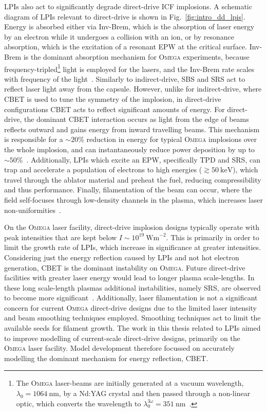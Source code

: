 \ac{LPIs} also act to significantly degrade direct-drive \ac{ICF} implosions.
A schematic diagram of \ac{LPIs} relevant to direct-drive is shown in Fig.~\ref{fig:intro_dd_lpis}.
Energy is absorbed either via \ac{Inv-Brem}, which is the absorption of laser energy by an electron while it undergoes a collision with an ion, or by resonance absorption, which is the excitation of a resonant \ac{EPW} at the critical surface.
\ac{Inv-Brem} is the dominant absorption mechanism for \textsc{Omega} experiments, because frequency-tripled\footnote{The \textsc{Omega} laser-beams are initially generated at a vacuum wavelength, $\lambda_0 = 1064\ \text{nm}$, by a Nd:YAG crystal and then passed through a non-linear optic, which converts the wavelength to $\lambda_0^{3\omega}=351\ \text{nm}$~\cite{boehly_upgrade_1995}.} light is employed for the lasers, and the \ac{Inv-Brem} rate scales with frequency of the light~\cite{huba_nrl_2013}.
Similarly to indirect-drive, \ac{SBS} and \ac{SRS} act to reflect laser light away from the capsule.
However, unlike for indirect-drive, where \ac{CBET} is used to tune the symmetry of the implosion, in direct-drive configurations \ac{CBET} acts to reflect significant amounts of energy.
For direct-drive, the dominant \ac{CBET} interaction occurs as light from the edge of beams reflects outward and gains energy from inward travelling beams.
This mechanism is responsible for a $\sim20\%$ reduction in energy for typical \textsc{Omega} implosions over the whole implosion, and can instantaneously reduce power deposition by up to $\sim50\%$~\cite{colaitis_inverse_2021}.
Additionally, \ac{LPIs} which excite an \ac{EPW}, specifically \ac{TPD} and \ac{SRS}, can trap and accelerate a population of electrons to high energies ($\gtrsim50\ \text{keV}$), which travel through the ablator material and preheat the fuel, reducing compressibility and thus performance.
Finally, filamentation of the beam can occur, where the field self-focuses through low-density channels in the plasma, which increases laser non-uniformities~\cite{afshar-rad_evidence_1992}.

On the \textsc{Omega} laser facility, direct-drive implosion designs typically operate with peak intensities that are kept below $I\sim10^{19}\ \text{Wm}^{-2}$.
This is primarily in order to limit the growth rate of \ac{LPIs}, which increase in significance at greater intensities.
Considering just the energy reflection caused by \ac{LPIs} and not hot electron generation, \ac{CBET} is the dominant instability on \textsc{Omega}.
Future direct-drive facilities with greater laser energy would lead to longer plasma scale-lengths.
In these long scale-length plasmas additional instabilities, namely \ac{SRS}, are observed to become more significant~\cite{scott_shock_2021}.
Additionally, laser filamentation is not a significant concern for current \textsc{Omega} direct-drive designs due to the limited laser intensity and beam smoothing techniques employed.
Smoothing techniques act to limit the available seeds for filament growth.
The work in this thesis related to \ac{LPIs} aimed to improve modelling of current-scale direct-drive designs, primarily on the \textsc{Omega} laser facility.
Model development therefore focussed on accurately modelling the dominant mechanism for energy reflection, \ac{CBET}.

